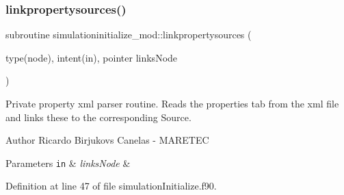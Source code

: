\mbox{\label{namespacesimulationinitialize__mod_aa4c1099b84c9901ab1286a3796a54f71}} 
\subsubsection{\texorpdfstring{linkpropertysources()}{linkpropertysources()}}
{\footnotesize\ttfamily subroutine simulationinitialize\+\_\+mod\+::linkpropertysources (\begin{DoxyParamCaption}\item[{type(node), intent(in), pointer}]{links\+Node }\end{DoxyParamCaption})\hspace{0.3cm}{\ttfamily [private]}}



Private property xml parser routine. Reads the properties tab from the xml file and links these to the corresponding Source. 

\begin{DoxyAuthor}{Author}
Ricardo Birjukovs Canelas -\/ M\+A\+R\+E\+T\+EC 
\end{DoxyAuthor}

\begin{DoxyParams}[1]{Parameters}
\mbox{\tt in}  & {\em links\+Node} & \\
\hline
\end{DoxyParams}


Definition at line 47 of file simulation\+Initialize.\+f90.


